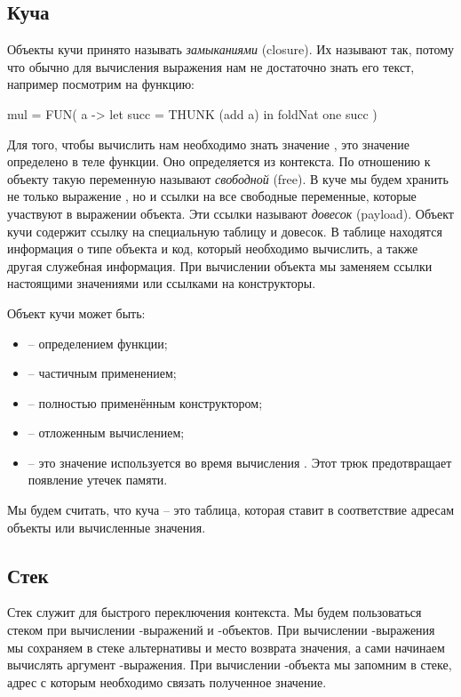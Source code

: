 \subsection{Куча}

Объекты кучи принято называть \emph{замыканиями} (closure).
Их называют так, потому что обычно для вычисления выражения
нам не достаточно знать его текст, например посмотрим на
функцию:

\begin{code}
mul     = FUN( a -> 
            let succ = THUNK (add a)
            in  foldNat one succ
          )
\end{code}

Для того, чтобы вычислить  нам необходимо
знать значение , это значение определено в теле функции.
Оно определяется из контекста. По отношению к объекту
такую переменную называют \emph{свободной} (free). 
В куче мы будем хранить не только выражение ,
но и ссылки на все свободные переменные, которые участвуют
в выражении объекта. Эти ссылки называют \emph{довесок} (payload).
Объект кучи содержит ссылку на специальную таблицу и довесок. 
В таблице находятся информация о типе объекта и 
код, который необходимо вычислить, а также другая 
служебная информация. При вычислении объекта мы заменяем
ссылки настоящими значениями или ссылками на конструкторы. 

Объект кучи может быть:

\begin{itemize}
\item {} -- определением функции;
\item {} -- частичным применением;
\item {} -- полностью применённым конструктором;
\item {} -- отложенным вычислением;
\item {} -- это значение используется во время вычисления
    . Этот трюк предотвращает появление утечек памяти. 
\end{itemize}

Мы будем считать, что куча -- это таблица, которая ставит 
в соответствие адресам объекты или вычисленные значения.


\subsection{Стек}

Стек служит для быстрого переключения контекста. Мы будем пользоваться
стеком при вычислении -выражений и -объектов. 
При вычислении -выражения мы сохраняем в стеке альтернативы
и место возврата значения, а сами начинаем вычислять аргумент
-выражения. При вычислении -объекта мы запомним
в стеке, адрес с которым необходимо связать полученное значение. 

